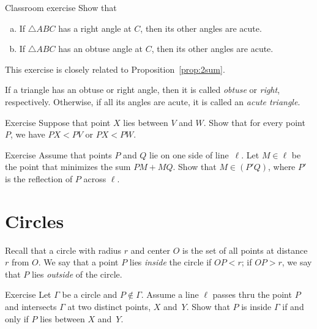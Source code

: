 \begin{thm}{Classroom exercise}\label{ex:right-acute}
Show that
\begin{enumerate}[(a)]
\item If $\triangle ABC$ has a right angle at $C$, then its other angles are acute.
\item If $\triangle ABC$ has an obtuse angle at $C$, then its other angles are acute.
\end{enumerate}
\end{thm}

This exercise is closely related to Proposition~\ref{prop:2sum}.

If a triangle has an obtuse or right angle, then it is called \emph{obtuse} or \emph{right}, respectively.
Otherwise, if all its angles are acute, it is called an \emph{acute triangle}.

\begin{thm}[!]{Exercise}\label{ex:obtuce}
Suppose that point $X$ lies between $V$ and $W$.
Show that for every point $P$, we have $PX < PV$ or $PX < PW$.
\end{thm}

\begin{thm}{Exercise}\label{ex:PMQ}
Assume that points $P$ and $Q$ lie on one side of line~$\ell$.
Let $M\in \ell$ be the point that minimizes the sum $PM+MQ$.
Show that $M\in (P'Q)$, where $P'$ is the reflection of $P$ across $\ell$.
\end{thm}



\section{Circles}

Recall that a circle with radius $r$ and center $O$ is the set of all points at distance $r$ from $O$.
We say that a point $P$ lies \emph{inside} the circle if $OP<r$;
if $OP>r$, we say that $P$ lies \emph{outside} of the circle.
\label{def:circle}

\begin{thm}[!]{Exercise}\label{ex:inside-outside}
Let $\Gamma$ be a circle and $P\notin \Gamma$.
Assume a line $\ell$ passes thru the point $P$
and intersects $\Gamma$ at two distinct points, $X$ and~$Y$.
Show that $P$ is inside $\Gamma$ if and only if $P$ lies between $X$ and~$Y$.
\end{thm}

